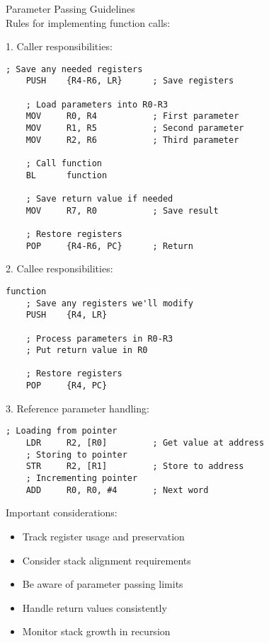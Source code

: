 \begin{KR}{Parameter Passing Guidelines}\\
Rules for implementing function calls:

1. Caller responsibilities:
\begin{lstlisting}[language=armasm, style=basesmol]
    ; Save any needed registers
    PUSH    {R4-R6, LR}      ; Save registers

    ; Load parameters into R0-R3
    MOV     R0, R4           ; First parameter
    MOV     R1, R5           ; Second parameter
    MOV     R2, R6           ; Third parameter

    ; Call function
    BL      function

    ; Save return value if needed
    MOV     R7, R0           ; Save result

    ; Restore registers
    POP     {R4-R6, PC}      ; Return
\end{lstlisting}

2. Callee responsibilities:
\begin{lstlisting}[language=armasm, style=basesmol]
function
    ; Save any registers we'll modify
    PUSH    {R4, LR}
    
    ; Process parameters in R0-R3
    ; Put return value in R0
    
    ; Restore registers
    POP     {R4, PC}
\end{lstlisting}

3. Reference parameter handling:
\begin{lstlisting}[language=armasm, style=basesmol]
    ; Loading from pointer
    LDR     R2, [R0]         ; Get value at address
    ; Storing to pointer
    STR     R2, [R1]         ; Store to address
    ; Incrementing pointer
    ADD     R0, R0, #4       ; Next word
\end{lstlisting}
\end{KR}

\begin{remark}
Important considerations:
\begin{itemize}
  \item Track register usage and preservation
  \item Consider stack alignment requirements
  \item Be aware of parameter passing limits
  \item Handle return values consistently
  \item Monitor stack growth in recursion
\end{itemize}
\end{remark}


